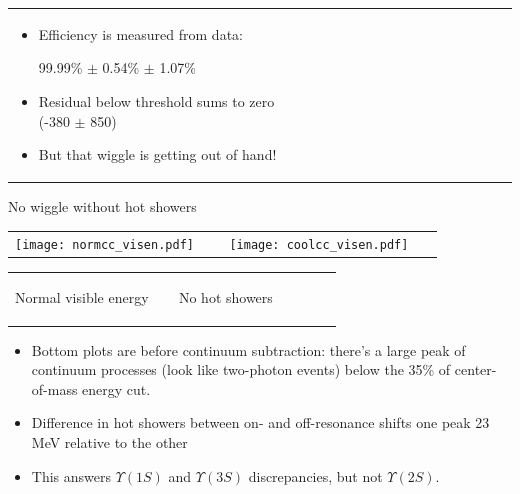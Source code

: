 \documentclass[landscape]{article}
\begin{document}
\begin{tabular}{p{0.6\linewidth} p{0.4\linewidth}}
\begin{minipage}{1.1\linewidth}
    \begin{itemize}

      \item Efficiency is measured from data:
\begin{center} 99.99\% $\pm$ 0.54\% $\pm$ 1.07\% \end{center}

\vspace{1 cm}
      \item Residual below threshold sums to zero (-380 $\pm$ 850)

\vspace{1 cm}
      \item But that wiggle is getting out of hand!

    \end{itemize}

  \end{minipage} \\
\end{tabular}

\pagebreak

No wiggle without hot showers

\vfill

\begin{center}
  \begin{tabular}{p{0.45\linewidth} p{0.45\linewidth}}
    \texttt{[image: normcc\_visen.pdf]} &
    \texttt{[image: coolcc\_visen.pdf]}
  \end{tabular}

  \begin{tabular}{p{0.45\linewidth} p{0.45\linewidth}}
    \begin{minipage}{\linewidth} \begin{center} Normal visible energy \end{center} \end{minipage} &
    \begin{minipage}{\linewidth} \begin{center} No hot showers \end{center} \end{minipage}
  \end{tabular}
\end{center}

\vfill

\begin{itemize}

  \item Bottom plots are before continuum subtraction: there's a large
  peak of continuum processes (look like two-photon events) below the
  35\% of center-of-mass energy cut.

\vfill
  \item Difference in hot showers between on- and off-resonance shifts
  one peak 23 MeV relative to the other

\vfill
  \item This answers $\Upsilon(1S)$ and $\Upsilon(3S)$ discrepancies,
  but not $\Upsilon(2S)$.

\end{itemize}
\end{document}
